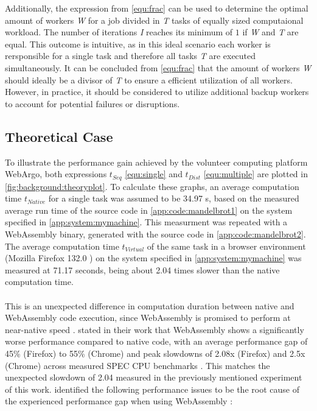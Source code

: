 Additionally, the expression from \eqref{equ:frac} can be used to determine the optimal amount of workers \emph{W} for a job divided in \emph{T} tasks of equally sized computaional workload. The number of iterations \emph{I} reaches its minimum of $1$ if \emph{W} and \emph{T} are equal. This outcome is intuitive, as in this ideal scenario each worker is rersponsible for a single task and therefore all tasks \emph{T} are executed simultaneously. It can be concluded from \eqref{equ:frac} that the amount of workers \emph{W} should ideally be a divisor of \emph{T} to ensure a efficient utilization of all workers. However, in practice, it should be considered to utilize additional backup workers to account for potential failures or disruptions.

\subsection{Theoretical Case}
\label{subsec:concept:theroy_example}
To illustrate the performance gain achieved by the volunteer computing platform WebArgo, both expressions $t_{Seq}$ \eqref{equ:single} and $t_{Dist}$ \eqref{equ:multiple} are plotted in \autoref{fig:background:theoryplot}. To calculate these graphs, an average computation time $t_{Native}$ for a single task was assumed to be 34.97 s, based on the measured average run time of the source code in \autoref{app:code:mandelbrot1} on the system specified in \autoref{app:system:mymachine}. This measurment was repeated with a WebAssembly binary, generated with the source code in \autoref{app:code:mandelbrot2}. The average computation time $t_{Virtual}$ of the same task in a browser environment (Mozilla Firefox 132.0 \cite{background:firefox}) on the system specified in \autoref{app:system:mymachine} was measured at 71.17 seconds, being about 2.04 times slower than the native computation time.
\\~\\
This is an unexpected difference in computation duration between native and WebAssembly code execution, since WebAssembly is promised to perform at near-native speed \cite{methodology:wasm, methodology:wasmW3C}. \citeauthor{background:not-so-fast} stated in their work that WebAssembly shows a significantly worse performance compared to native code, with an average performance gap of 45\% (Firefox) to 55\% (Chrome) and peak slowdowns of 2.08x (Firefox) and 2.5x (Chrome) across measured SPEC \acs{CPU} benchmarks \cite{background:not-so-fast}. This matches the unexpected slowdown of 2.04 measured in the previously mentioned experiment of this work. \citeauthor{background:not-so-fast} identified the following performance issues to be the root cause of the experienced performance gap when using WebAssembly \cite{background:not-so-fast}:
